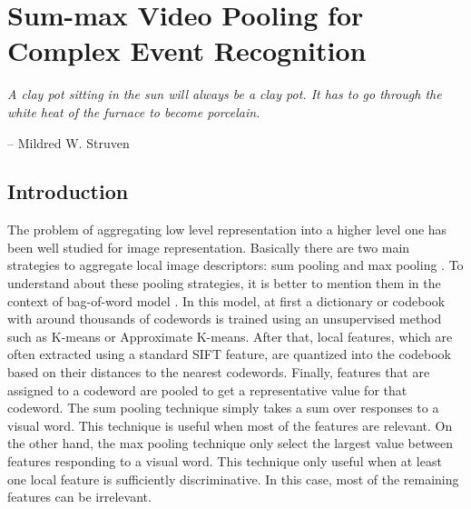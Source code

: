 
\chapter{Sum-max Video Pooling for Complex Event Recognition}
\label{chapter4}
\epigraph{\textit{A clay pot sitting in the sun will always be a clay pot. It has to go through the white heat of the furnace to become porcelain.}}{ -- Mildred W. Struven}

\ifpdf
    \graphicspath{{Chapter4/Figs/Raster/}{Chapter4/Figs/PDF/}{Chapter4/Figs/}}
\else
    \graphicspath{{Chapter4/Figs/Vector/}{Chapter4/Figs/}}
\fi

\section{Introduction}
\label{sec:intro}

The problem of aggregating low level representation into a higher level one has been well studied for image representation. Basically there are two main strategies to aggregate local image descriptors: sum pooling \cite{Koenderink:1999} and max pooling \cite{Serre05objectrecognition}. To understand about these pooling strategies, it is better to mention them in the context of bag-of-word model \cite{Csurka04visualcategorization}. In this model, at first a dictionary or codebook with around thousands of codewords is trained using an unsupervised method such as K-means or Approximate K-means. After that, local features, which are often extracted using a standard SIFT \cite{Lowe:2004} feature, are quantized into the codebook based on their distances to the nearest codewords. Finally, features that are assigned to a codeword are pooled to get a representative value for that codeword. The sum pooling technique simply takes a sum over responses to a visual word. This technique is useful when most of the features are relevant. On the other hand, the max pooling technique only select the largest value between features responding to a visual word. This technique only useful when at least one local feature is sufficiently discriminative. In this case, most of the remaining features can be irrelevant. 


